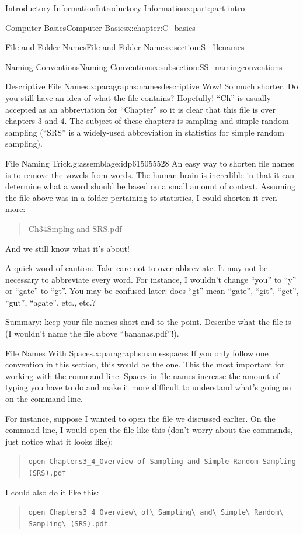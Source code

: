 \documentclass[oneside,10pt,]{book}
\newcommand{\mono}[1]{\texttt{#1}}
\begin{document}
\begin{partptx}{Introductory Information}{}{Introductory Information}{}{}{x:part:part-intro}
\begin{chapterptx}{Computer Basics}{}{Computer Basics}{}{}{x:chapter:C_basics}
\begin{sectionptx}{File and Folder Names}{}{File and Folder Names}{}{}{x:section:S_filenames}
\begin{subsectionptx}{Naming Conventions}{}{Naming Conventions}{}{}{x:subsection:SS_namingconventions}
\begin{paragraphs}{Descriptive File Names.}{x:paragraphs:namesdescriptive}
 Wow! So much shorter. Do you still have an idea of what the file contains? Hopefully! ``Ch'' is usually accepted as an abbreviation for ``Chapter'' so it is clear that this file is over chapters 3 and 4. The subject of these chapters is sampling and simple random sampling (``SRS'' is a widely-used abbreviation in statistics for simple random sampling).%
\begin{assemblage}{File Naming Trick.}{g:assemblage:idp615055528}%
An easy way to shorten file names is to remove the vowels from words. The human brain is incredible in that it can determine what a word should be based on a small amount of context. Assuming the file above was in a folder pertaining to statistics, I could shorten it even more: \begin{quote}%
Ch3\textunderscore{}4\textunderscore{}Smplng and SRS.pdf\end{quote}
 And we still know what it's about!%
\par
A quick word of caution. Take care not to over-abbreviate. It may not be necessary to abbreviate every word. For instance, I wouldn't change ``you'' to ``y'' or ``gate'' to ``gt''. You may be confused later: does ``gt'' mean ``gate'', ``git'', ``get'', ``gut'', ``agate'', etc., etc.?%
\end{assemblage}
Summary: keep your file names short and to the point. Describe what the file is (I wouldn't name the file above ``bananas.pdf''!).%
\end{paragraphs}%
\begin{paragraphs}{File Names With Spaces.}{x:paragraphs:namesspaces}%
%
If you only follow one convention in this section, this would be the one. This the most important for working with the command line. Spaces in file names increase the amount of typing you have to do and make it more difficult to understand what's going on on the command line.%
\par
For instance, suppose I wanted to open the file we discussed earlier. On the command line, I would open the file like this (don't worry about the commands, just notice what it looks like): \begin{quote}%
\mono{open \textquotesingle{}Chapters3\_4\_Overview of Sampling and Simple Random Sampling (SRS).pdf\textquotesingle{}}\end{quote}
 I could also do it like this: \begin{quote}%
\mono{open Chapters3\_4\_Overview\textbackslash{} of\textbackslash{} Sampling\textbackslash{} and\textbackslash{} Simple\textbackslash{} Random\textbackslash{} Sampling\textbackslash{} (SRS).pdf}\end{quote}

\end{paragraphs}
\end{subsectionptx}
\end{sectionptx}
\end{chapterptx}
\end{partptx}
\end{document}
